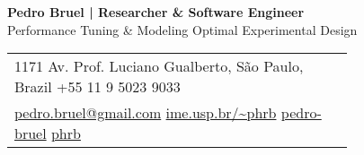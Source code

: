 \documentclass[a4paper,10pt]{article}
\date{\today}
\title{}
\begin{document}
\parbox[top][0.12\textheight][c]{\linewidth}{ %
    \vspace{-0.08\textheight} %
    \centering %
    {\LARGE \textbf{Pedro Bruel | Researcher \& Software Engineer}}\\\medskip %
    {\Large Performance Tuning \& Modeling \textbullet{} Optimal Experimental Design}
}


\parbox[top][0.12\textheight][c]{\linewidth}{ %
    \vspace{-0.19\textheight} %
    \centering
    \colorbox{shade}{ %
        \begin{supertabular}{p{0.75\linewidth}} %
            \raisebox{-1pt}{\faHome} \hspace{0.15cm} 1171 Av. Prof. Luciano Gualberto, São Paulo, Brazil \hspace{0.2cm} \raisebox{-1pt}{\faPhone} \hspace{0.14cm} +55 11 9 5023 9033 \\ %
            \raisebox{0pt}{\small\faEnvelope} \hspace{0.2cm} \href{mailto:pedro.bruel@gmail.com}{pedro.bruel@gmail.com} \hspace{0.2cm} \raisebox{0pt}{\small\faDesktop} \hspace{0.2cm} \href{https://www.ime.usp.br/~phrb}{ime.usp.br/\textasciitilde{}phrb} \hspace{0.31cm} \raisebox{-1pt}{\faLinkedin} \hspace{0.2cm} \href{https://www.linkedin.com/in/pedro-bruel}{pedro-bruel} \hspace{0.2cm} \raisebox{-1pt}{\faGithub} \hspace{0.2cm} \href{https://github.com/phrb}{phrb} \\
        \end{supertabular}
    }
}
\end{document}
